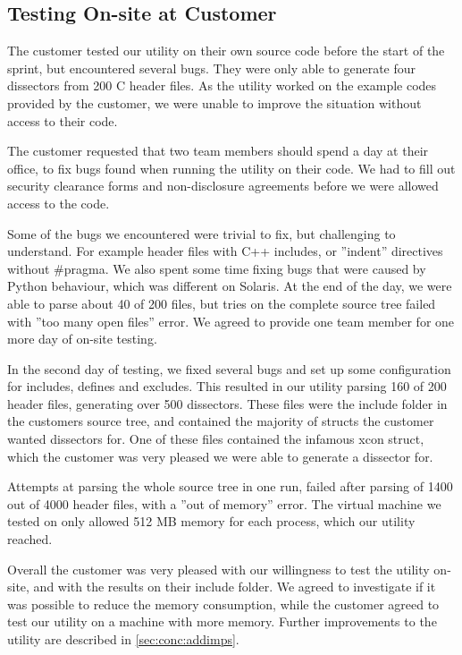 \subsection{Testing On-site at Customer}
\label{sec:sp4:onsite}
The customer tested our utility on their own source code before the start of
the sprint, but encountered several bugs. They were only able to generate four
dissectors from 200 C header files. As the utility worked on the example codes
provided by the customer, we were unable to improve the situation without 
access to their code.

The customer requested that two team members should spend a day
at their office, to fix bugs found when running the utility on their code.
We had to fill out security clearance forms and non-disclosure agreements
before we were allowed access to the code.

Some of the bugs we encountered were trivial to fix, but challenging to
understand. For example header files with C++ includes, or ''indent''
directives without \#pragma. We also spent some time fixing bugs that
were caused by Python behaviour, which was different on Solaris. At the
end of the day, we were able to parse about 40 of 200 files, but tries on
the complete source tree failed with ''too many open files'' error. We
agreed to provide one team member for one more day of on-site testing.

In the second day of testing, we fixed several bugs and set up some
configuration for includes, defines and excludes. This resulted in our utility
parsing 160 of 200 header files, generating over 500 dissectors. These files
were the include folder in the customers source tree, and contained the
majority of structs the customer wanted dissectors for. One of these files
contained the infamous xcon struct, which the customer was very pleased we
were able to generate a dissector for.

Attempts at parsing the whole source tree in one run, failed after parsing
of 1400 out of 4000 header files, with a ''out of memory'' error. The
virtual machine we tested on only allowed 512 MB memory for each process,
which our utility reached.

Overall the customer was very pleased with our willingness to test the utility
on-site, and with the results on their include folder. We agreed to
investigate if it was possible to reduce the memory consumption, while the
customer agreed to test our utility on a machine with more memory. Further
improvements to the utility are described in \autoref{sec:conc:addimps}.


